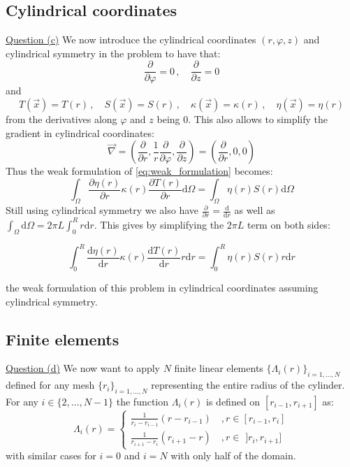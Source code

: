 \subsection{Cylindrical coordinates}
\underline{Question (c)}
We now introduce the cylindrical coordinates $(r, \varphi, z)$ and cylindrical symmetry in the problem to have that:
\begin{equation}
    \frac{\partial}{\partial \varphi} = 0 \, ,\quad \frac{\partial}{\partial z} = 0
\end{equation}
and
\begin{equation}
    T(\vec{x}) = T(r) \, , \quad S(\vec{x}) = S(r) \, , \quad \kappa(\vec{x}) = \kappa(r) \, , \quad \eta(\vec{x}) = \eta(r)
\end{equation}
from the derivatives along $\varphi$ and $z$ being 0. This also allows to simplify the gradient in cylindrical coordinates:
\begin{equation}
    \vec{\nabla} = \left(\frac{\partial}{\partial r}, \frac{1}{r}\frac{\partial}{\partial \varphi}, \frac{\partial}{\partial z}\right) = \left(\frac{\partial}{\partial r}, 0, 0\right)
\end{equation}
Thus the weak formulation of \autoref{eq:weak_formulation} becomes:
\begin{equation}
    \int_\Omega \frac{\partial \eta (r)}{\partial r} \kappa(r) \frac{\partial T(r)}{\partial r} \mathrm{d}\Omega = \int_\Omega \eta(r)S(r) \mathrm{d}\Omega
\end{equation}
Still using cylindrical symmetry we also have $\frac{\partial}{\partial r} = \frac{\mathrm{d}}{\mathrm{d}r}$ as well as $\int_\Omega \mathrm{d}\Omega = 2\pi L \int_0^R r \mathrm{d}r$. This gives by simplifying the $2\pi L$ term on both sides:

\begin{equation}
    \int_0^R \frac{\mathrm{d} \eta (r)}{\mathrm{d} r} \kappa(r) \frac{\mathrm{d} T(r)}{\mathrm{d} r} r \mathrm{d}r = \int_0^R \eta(r)S(r) r \mathrm{d}r
    \label{eq:formulation_cylindrical}
\end{equation}

the weak formulation of this problem in cylindrical coordinates assuming cylindrical symmetry.

\subsection{Finite elements}
\underline{Question (d)}
We now want to apply $N$ finite linear elements $\{\Lambda_i(r)\}_{i=1,\ldots,N}$ defined for any mesh $\{r_i\}_{i=1,\ldots,N}$ representing the entire radius of the cylinder. For any $i \in \{2,\ldots,N-1\}$ the function $\Lambda_i(r)$ is defined on $[r_{i-1}, r_{i+1}]$ as:
\begin{equation}
    \Lambda_i(r) = \begin{cases}
        \frac{1}{r_i - r_{i-1}}(r - r_{i-1}) \quad , r \in [r_{i-1}, r_i] \\
        \frac{1}{r_{i+1} - r_i}(r_{i+1} - r) \quad , r \in \,\, ]r_i, r_{i+1}]
    \end{cases}
\end{equation}
with similar cases for $i=0$ and $i=N$ with only half of the domain.

